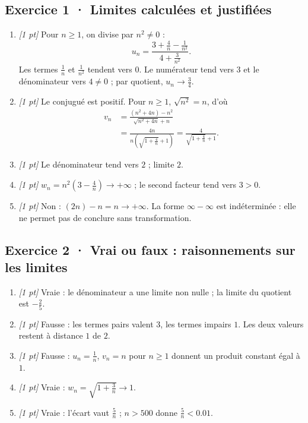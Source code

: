 \subsection*{Exercice 1 · Limites calculées et justifiées}\begin{enumerate}

\item \textit{[1 pt]} Pour $n\ge1$, on divise par $n^2\ne0$ :
\[u_n=\frac{3+\frac{4}{n}-\frac{1}{n^2}}{4+\frac{3}{n^2}}.\]
Les termes $\frac{1}{n}$ et $\frac{1}{n^2}$ tendent vers $0$. Le numérateur tend vers $3$ et le dénominateur vers $4\ne0$ ; par quotient, $u_n\to\frac{3}{4}$.

\item \textit{[1 pt]} Le conjugué est positif. Pour $n\ge1$, $\sqrt{n^2}=n$, d'où
\[\begin{aligned}v_n&=\frac{(n^2+4n)-n^2}{\sqrt{n^2+4n}+n}\\&=\frac{4n}{n(\sqrt{1+\frac{4}{n}}+1)}=\frac{4}{\sqrt{1+\frac{4}{n}}+1}.\end{aligned}\]

\item \textit{[1 pt]} Le dénominateur tend vers $2$ ; limite $2$.

\item \textit{[1 pt]} $w_n=n^2(3-\frac{4}{n})\to+\infty$ ; le second facteur tend vers $3>0$.

\item \textit{[1 pt]} Non : $(2n)-n=n\to+\infty$. La forme $\infty-\infty$ est indéterminée : elle ne permet pas de conclure sans transformation.

\end{enumerate}

\subsection*{Exercice 2 · Vrai ou faux : raisonnements sur les limites}\begin{enumerate}

\item \textit{[1 pt]} Vraie : le dénominateur a une limite non nulle ; la limite du quotient est $-\frac{2}{5}$.

\item \textit{[1 pt]} Fausse : les termes pairs valent $3$, les termes impairs $1$. Les deux valeurs restent à distance $1$ de $2$.

\item \textit{[1 pt]} Fausse : $u_n=\frac{1}{n}$, $v_n=n$ pour $n\ge1$ donnent un produit constant égal à $1$.

\item \textit{[1 pt]} Vraie : $w_n=\sqrt{1+\frac{3}{n}}\to1$.

\item \textit{[1 pt]} Vraie : l'écart vaut $\frac{5}{n}$ ; $n>500$ donne $\frac{5}{n}<\num{0,01}$.

\end{enumerate}

